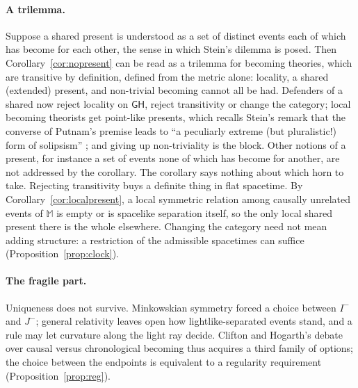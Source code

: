 \documentclass[11pt]{article}
\theoremstyle{definition}
\newcommand{\GH}{\mathsf{GH}}
\newcommand{\Mink}{\mathbb M}
\newcommand{\Ichr}{I^{-}}
\newcommand{\Jm}{J^{-}}
\begin{document}
\paragraph{A trilemma.} Suppose a shared present is understood as a set of
distinct events each of which has become for each other, the sense in which
Stein's dilemma is posed. Then Corollary~\ref{cor:nopresent} can be read as a
trilemma for becoming theories, which are transitive by definition, defined from the metric alone: locality, a
shared (extended) present, and non-trivial becoming cannot all be had. Defenders of a shared now reject locality on $\GH$, reject transitivity or change the category; local becoming theorists get
point-like presents, which recalls Stein's remark that the converse of
Putnam's premise leads to ``a peculiarly extreme (but pluralistic!) form of
solipsism'' \citep[p.~18]{Stein1968}; and giving up non-triviality is the
block. Other notions of a present, for instance a set of events none of which
has become for another, are not addressed by the corollary. The corollary
says nothing about which horn to take. Rejecting transitivity buys a definite
thing in flat spacetime. By Corollary~\ref{cor:localpresent}, a local
symmetric relation among causally unrelated events of $\Mink$ is empty or is
spacelike separation itself, so the only local shared present there is the
whole elsewhere. Changing the category need not mean adding structure: a
restriction of the admissible spacetimes can suffice
(Proposition~\ref{prop:clock}).

\paragraph{The fragile part.} Uniqueness does not survive. Minkowskian
symmetry forced a choice between $\Ichr$ and $\Jm$; general relativity leaves
open how lightlike-separated events stand, and a rule may let curvature along
the light ray decide. Clifton and Hogarth's debate over causal versus
chronological becoming \citep[pp.~364--365]{CH1995} thus acquires a third
family of options; the choice between the endpoints is equivalent to a
regularity requirement (Proposition~\ref{prop:reg}).
\end{document}
